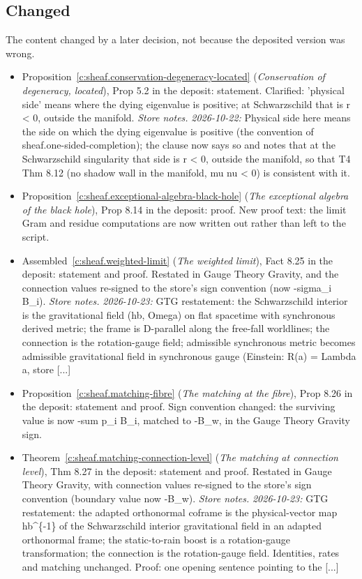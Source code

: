 \documentclass[11pt]{article}
\theoremstyle{definition}
\theoremstyle{plain}
\begin{document}
\subsection*{Changed}
The content changed by a later decision, not because the deposited version was wrong.
\begin{itemize}\setlength{\itemsep}{2pt}
\item Proposition~\ref{c:sheaf.conservation-degeneracy-located} (\emph{Conservation of degeneracy, located}), Prop 5.2 in the deposit: statement. Clarified: 'physical side' means where the dying eigenvalue is positive; at Schwarzschild that is r < 0, outside the manifold. \emph{Store notes.} \emph{2026-10-22:} Physical side here means the side on which the dying eigenvalue is positive (the convention of sheaf.one-sided-completion); the clause now says so and notes that at the Schwarzschild singularity that side is r < 0, outside the manifold, so that T4 Thm 8.12 (no shadow wall in the manifold, mu nu < 0) is consistent with it.
\item Proposition~\ref{c:sheaf.exceptional-algebra-black-hole} (\emph{The exceptional algebra of the black hole}), Prop 8.14 in the deposit: proof. New proof text: the limit Gram and residue computations are now written out rather than left to the script.
\item Assembled~\ref{c:sheaf.weighted-limit} (\emph{The weighted limit}), Fact 8.25 in the deposit: statement and proof. Restated in Gauge Theory Gravity, and the connection values re-signed to the store's sign convention (now -sigma\_i B\_i). \emph{Store notes.} \emph{2026-10-23:} GTG restatement: the Schwarzschild interior is the gravitational field (hb, Omega) on flat spacetime with synchronous derived metric; the frame is D-parallel along the free-fall worldlines; the connection is the rotation-gauge field; admissible synchronous metric becomes admissible gravitational field in synchronous gauge (Einstein: R(a) = Lambda a, store [...]
\item Proposition~\ref{c:sheaf.matching-fibre} (\emph{The matching at the fibre}), Prop 8.26 in the deposit: statement and proof. Sign convention changed: the surviving value is now -sum p\_i B\_i, matched to -B\_w, in the Gauge Theory Gravity sign.
\item Theorem~\ref{c:sheaf.matching-connection-level} (\emph{The matching at connection level}), Thm 8.27 in the deposit: statement and proof. Restated in Gauge Theory Gravity, with connection values re-signed to the store's sign convention (boundary value now -B\_w). \emph{Store notes.} \emph{2026-10-23:} GTG restatement: the adapted orthonormal coframe is the physical-vector map hb\^{}\{-1\} of the Schwarzschild interior gravitational field in an adapted orthonormal frame; the static-to-rain boost is a rotation-gauge transformation; the connection is the rotation-gauge field. Identities, rates and matching unchanged. Proof: one opening sentence pointing to the [...]
\end{itemize}
\end{document}
